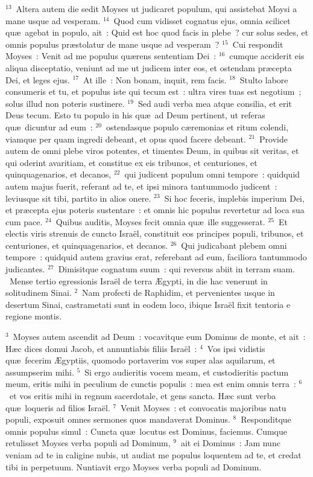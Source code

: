 ${}^{13}$~Altera autem die sedit Moyses ut judicaret populum, qui assistebat Moysi a mane usque ad vesperam.
${}^{14}$~Quod cum vidisset cognatus ejus, omnia scilicet qu\ae\ agebat in populo, ait~: Quid est hoc quod facis in plebe~? cur solus sedes, et omnis populus pr\ae stolatur de mane usque ad vesperam~?
${}^{15}$~Cui respondit Moyses~: Venit ad me populus qu\ae rens sententiam Dei~:
${}^{16}$~cumque acciderit eis aliqua disceptatio, veniunt ad me ut judicem inter eos, et ostendam pr\ae cepta Dei, et leges ejus.
${}^{17}$~At ille~: Non bonam, inquit, rem facis.
${}^{18}$~Stulto labore consumeris et tu, et populus iste qui tecum est~: ultra vires tuas est negotium~; solus illud non poteris sustinere.
${}^{19}$~Sed audi verba mea atque consilia, et erit Deus tecum. Esto tu populo in his qu\ae\ ad Deum pertinent, ut referas qu\ae\ dicuntur ad eum~:
${}^{20}$~ostendasque populo c\ae remonias et ritum colendi, viamque per quam ingredi debeant, et opus quod facere debeant.
${}^{21}$~Provide autem de omni plebe viros potentes, et timentes Deum, in quibus sit veritas, et qui oderint avaritiam, et constitue ex eis tribunos, et centuriones, et quinquagenarios, et decanos,
${}^{22}$~qui judicent populum omni tempore~: quidquid autem majus fuerit, referant ad te, et ipsi minora tantummodo judicent~: leviusque sit tibi, partito in alios onere.
${}^{23}$~Si hoc feceris, implebis imperium Dei, et pr\ae cepta ejus poteris sustentare~: et omnis hic populus revertetur ad loca sua cum pace.
${}^{24}$~Quibus auditis, Moyses fecit omnia qu\ae\ ille suggesserat.
${}^{25}$~Et electis viris strenuis de cuncto Isra\"el, constituit eos principes populi, tribunos, et centuriones, et quinquagenarios, et decanos.
${}^{26}$~Qui judicabant plebem omni tempore~: quidquid autem gravius erat, referebant ad eum, faciliora tantummodo judicantes.
${}^{27}$~Dimisitque cognatum suum~: qui reversus abiit in terram suam.
~\lettrine[lines=10,image=true,loversize=0.05,lraise=-0.03]{M}{}ense tertio egressionis Isra\"el de terra \AE gypti, in die hac venerunt in solitudinem Sinai.
${}^{2}$~Nam profecti de Raphidim, et pervenientes usque in desertum Sinai, castrametati sunt in eodem loco, ibique Isra\"el fixit tentoria e regione montis.


${}^{3}$~Moyses autem ascendit ad Deum~: vocavitque eum Dominus de monte, et ait~: H\ae c dices domui Jacob, et annuntiabis filiis Isra\"el~:
${}^{4}$~Vos ipsi vidistis qu\ae\ fecerim \AE gyptiis, quomodo portaverim vos super alas aquilarum, et assumpserim mihi.
${}^{5}$~Si ergo audieritis vocem meam, et custodieritis pactum meum, eritis mihi in peculium de cunctis populis~: mea est enim omnis terra~:
${}^{6}$~et vos eritis mihi in regnum sacerdotale, et gens sancta. H\ae c sunt verba qu\ae\ loqueris ad filios Isra\"el.
${}^{7}$~Venit Moyses~: et convocatis majoribus natu populi, exposuit omnes sermones quos mandaverat Dominus.
${}^{8}$~Responditque omnis populus simul~: Cuncta qu\ae\ locutus est Dominus, faciemus. Cumque retulisset Moyses verba populi ad Dominum,
${}^{9}$~ait ei Dominus~: Jam nunc veniam ad te in caligine nubis, ut audiat me populus loquentem ad te, et credat tibi in perpetuum. Nuntiavit ergo Moyses verba populi ad Dominum.


